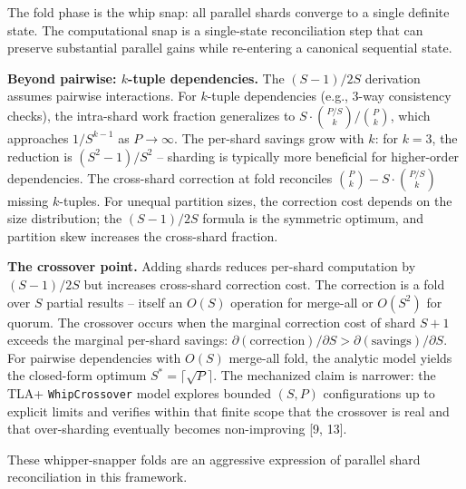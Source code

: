 \documentclass[
  11pt,
]{article}
\begin{document}
The fold phase is the whip snap: all parallel shards converge to a
single definite state. The computational snap is a single-state
reconciliation step that can preserve substantial parallel gains while
re-entering a canonical sequential state.

\textbf{Beyond pairwise: \(k\)-tuple dependencies.} The \((S-1)/2S\)
derivation assumes pairwise interactions. For \(k\)-tuple dependencies
(e.g., 3-way consistency checks), the intra-shard work fraction
generalizes to \(S \cdot \binom{P/S}{k} / \binom{P}{k}\), which
approaches \(1/S^{k-1}\) as \(P \to \infty\). The per-shard savings grow
with \(k\): for \(k=3\), the reduction is \((S^2-1)/S^2\) -- sharding is
typically more beneficial for higher-order dependencies. The cross-shard
correction at fold reconciles \(\binom{P}{k} - S \cdot \binom{P/S}{k}\)
missing \(k\)-tuples. For unequal partition sizes, the correction cost
depends on the size distribution; the \((S-1)/2S\) formula is the
symmetric optimum, and partition skew increases the cross-shard
fraction.

\textbf{The crossover point.} Adding shards reduces per-shard
computation by \((S-1)/2S\) but increases cross-shard correction cost.
The correction is a fold over \(S\) partial results -- itself an
\(O(S)\) operation for merge-all or \(O(S^2)\) for quorum. The crossover
occurs when the marginal correction cost of shard \(S+1\) exceeds the
marginal per-shard savings:
\(\partial(\text{correction})/\partial S > \partial(\text{savings})/\partial S\).
For pairwise dependencies with \(O(S)\) merge-all fold, the analytic
model yields the closed-form optimum \(S^* = \lceil\sqrt{P}\rceil\). The
mechanized claim is narrower: the TLA+ \texttt{WhipCrossover} model
explores bounded \((S, P)\) configurations up to explicit limits and
verifies within that finite scope that the crossover is real and that
over-sharding eventually becomes non-improving {[}9, 13{]}.

These whipper-snapper folds are an aggressive expression of parallel
shard reconciliation in this framework.
\end{document}
